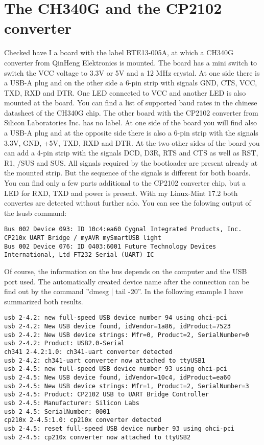 \section{The CH340G and the CP2102 converter }
Checked have I a board with the label BTE13-005A,
at which a CH340G converter from QinHeng Elektronics is mounted.
The board has a mini switch to switch the VCC voltage to 3.3V or 5V and a 12 MHz crystal.
At one side there is a USB-A plug and on the other side a 6-pin strip with signals
GND, CTS, VCC, TXD, RXD and DTR.
One LED connected to VCC and another LED is also mounted at the board.
You can find a list of supported baud rates in the chinese datasheet of the CH340G chip.
The other board with the CP2102 converter from Silicon Laboratories Inc. has no label.
At one side of the board you will find also a USB-A plug and at the opposite side there
is also a 6-pin strip with the signals 3.3V, GND, +5V, TXD, RXD and DTR.
At the two other sides of the board you can add a 4-pin strip with the 
signals DCD, D3R, RTS and CTS as well as RST, R1, /SUS and SUS.
All signals required by the bootloader are present already at the mounted strip.
But the sequence of the signals is different for both boards.
You can find only a few parts additional to the CP2102 converter chip,
but a LED for RXD, TXD and power is present.
With my Linux-Mint 17.2 both convertes are detected without further ado.
You can see the folowing output of the lsusb command:
\begin{verbatim}
Bus 002 Device 093: ID 10c4:ea60 Cygnal Integrated Products, Inc. CP210x UART Bridge / myAVR mySmartUSB light
Bus 002 Device 076: ID 0403:6001 Future Technology Devices International, Ltd FT232 Serial (UART) IC
\end{verbatim}
Of course, the information on the bus depends on the computer and the USB port used.
The automatically created device name after the connection can be find out by
the command ''dmesg | tail -20''. In the following example I have
summarized both results. 
\begin{verbatim}
usb 2-4.2: new full-speed USB device number 94 using ohci-pci
usb 2-4.2: New USB device found, idVendor=1a86, idProduct=7523
usb 2-4.2: New USB device strings: Mfr=0, Product=2, SerialNumber=0
usb 2-4.2: Product: USB2.0-Serial
ch341 2-4.2:1.0: ch341-uart converter detected
usb 2-4.2: ch341-uart converter now attached to ttyUSB1
usb 2-4.5: new full-speed USB device number 93 using ohci-pci
usb 2-4.5: New USB device found, idVendor=10c4, idProduct=ea60
usb 2-4.5: New USB device strings: Mfr=1, Product=2, SerialNumber=3
usb 2-4.5: Product: CP2102 USB to UART Bridge Controller
usb 2-4.5: Manufacturer: Silicon Labs
usb 2-4.5: SerialNumber: 0001
cp210x 2-4.5:1.0: cp210x converter detected
usb 2-4.5: reset full-speed USB device number 93 using ohci-pci
usb 2-4.5: cp210x converter now attached to ttyUSB2
\end{verbatim}

